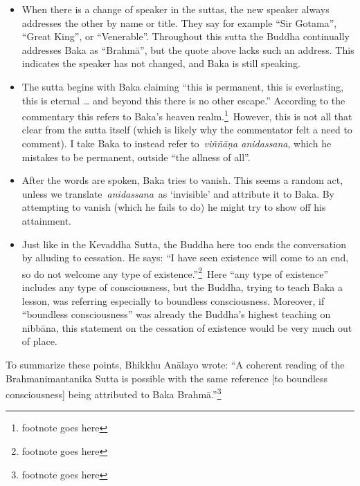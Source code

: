 \documentclass[10pt, openany]{book}
\begin{document}
\begin{itemize}

\itemsep5pt\parskip0pt


\item
When there is a change of speaker in the suttas, the new speaker always addresses the other by name or title. They say for example “Sir Gotama”, “Great King”, or “Venerable”. Throughout this sutta the Buddha continually addresses Baka as “Brahmā”, but the quote above lacks such an address. This indicates the speaker has not changed, and Baka is still speaking.



\item
The sutta begins with Baka claiming “this is permanent, this is everlasting, this is eternal … and beyond this there is no other escape.” According to the commentary this refers to Baka’s heaven realm.\footnote{footnote goes here} However, this is not all that clear from the sutta itself (which is likely why the commentator felt a need to comment). I take Baka to instead refer to \textit{viññāṇa anidassana}, which he mistakes to be permanent, outside “the allness of all”.



\item
After the words are spoken, Baka tries to vanish. This seems a random act, unless we translate \textit{anidassana} as ‘invisible’ and attribute it to Baka. By attempting to vanish (which he fails to do) he might try to show off his attainment.



\item
Just like in the Kevaddha Sutta, the Buddha here too ends the conversation by alluding to cessation. He says: “I have seen existence will come to an end, so do not welcome any type of existence.”\footnote{footnote goes here} Here “any type of existence” includes any type of consciousness, but the Buddha, trying to teach Baka a lesson, was referring especially to boundless consciousness. Moreover, if “boundless consciousness” was already the Buddha’s highest teaching on nibbāna, this statement on the cessation of existence would be very much out of place.





\end{itemize}
To summarize these points, Bhikkhu Anālayo wrote: “A coherent reading of the Brahmanimantanika Sutta is possible with the same reference [to boundless consciousness] being attributed to Baka Brahmā.”\footnote{footnote goes here}
\end{document}
